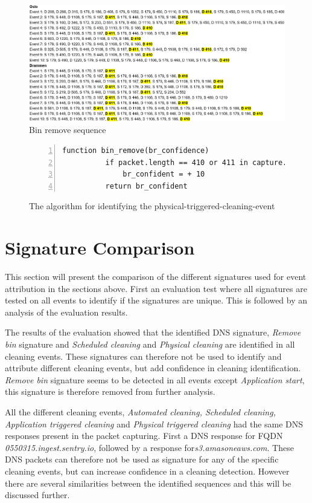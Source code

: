 \begin{figure}[H]
    \centering
    \includegraphics[width=\textwidth]{figures/Sequence_BR.png}
    \caption{Bin remove sequence}
    \label{fig:BRseq}
\end{figure}

\begin{figure}[H]
    \centering
    \begin{lstlisting}[numbers=left]
     function bin_remove(br_confidence)
          if packet.length == 410 or 411 in capture.file
              br_confident = + 10
          return br_confident
    \end{lstlisting}
    \caption{The algorithm for identifying the physical-triggered-cleaning-event}
    \label{fig:Sudo_code_BinRemove}
\end{figure}

\section{Signature Comparison}
This section will present the comparison of the different signatures used for event attribution in the sections above. First an evaluation test where all signatures are tested on all events to identify if the signatures are unique. This is followed by an analysis of the evaluation results.

The results of the evaluation showed that the identified DNS signature, \textit{Remove bin} signature and \textit{Scheduled cleaning} and \textit{Physical cleaning} are identified in all cleaning events. These signatures can therefore not be used to identify and attribute different cleaning events, but add confidence in cleaning identification. \textit{Remove bin} signature seems to be detected in all events except \textit{Application start}, this signature is therefore removed from further analysis. 

All the different cleaning events, \textit{Automated cleaning, Scheduled cleaning, Application triggered cleaning} and \textit{Physical triggered cleaning} had the same DNS responses present in the packet capturing. First a DNS response for FQDN \textit{0550315.ingest.sentry.io}, followed by a response for\textit{s3.amasoneaws.com}. These DNS packets can therefore not be used as signature for any of the specific cleaning events, but can increase confidence in a cleaning detection. However there are several similarities between the identified sequences and this will be discussed further.

